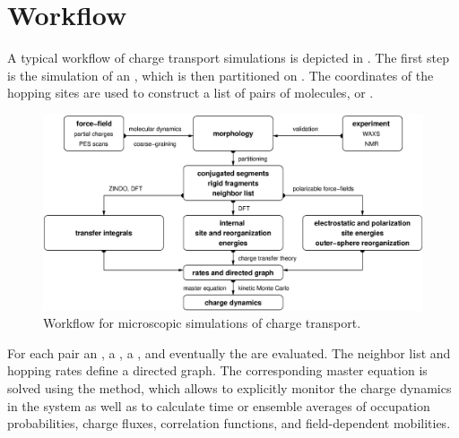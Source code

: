 \section{Workflow}
\label{sec:wokflow}

A typical workflow of charge transport simulations is depicted in . The first step is the simulation of an , which is then partitioned on . The coordinates of the hopping sites are used to construct a list of pairs of molecules, or . 

\begin{figure}[h]
\includegraphics[width=\textwidth]{fig/workflow/workflow}
 \caption{%
   Workflow for microscopic simulations of charge transport.  %
   \label{fig:workflow}}
\end{figure}

For each pair an , a , a , and eventually the  are evaluated. The neighbor list and hopping rates define a directed graph. The corresponding master equation is solved using the  method, which allows to explicitly monitor the charge dynamics in the system as well as to calculate time or ensemble averages of occupation probabilities, charge fluxes, correlation functions, and field-dependent mobilities.


